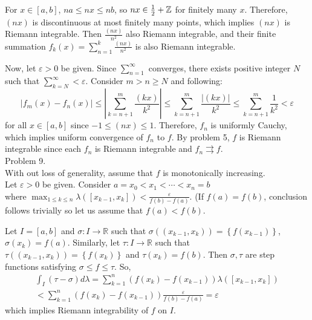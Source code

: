 For $x \in \left[ a, b \right]$, $na \leq nx \leq nb$, so $nx \in {1 \over 2} + \mathbb{Z}$ for finitely many $x$. Therefore, $(nx)$ is discontinuous at most finitely many points, which implies $\left( nx \right)$ is Riemann integrable.
Then $\frac{\left( nx \right)}{n^2}$ also Riemann integrable, and their finite summation $f_k (x) = \sum_{n=1}^{k} \frac{\left( nx \right)}{n^2}$ is also Riemann integrable.

Now, let $\varepsilon > 0$ be given. Since $\sum_{n=1}^{\infty}$ converges, there exists positive integer $N$ such that $\sum_{k=N}^{\infty} < \varepsilon$.
Consider $m > n \geq N$ and following:
\begin{equation*}
	\left | f_m(x) - f_n(x)  \right | \leq \left | \sum_{k=n+1}^{m} \frac{\left( kx \right)}{k^2} \right |
	\leq \sum_{k=n+1}^{m}\frac{\left | \left( kx \right) \right |}{k^2} \leq \sum_{k=n+1}^{m} \frac{1}{k^2} < \varepsilon
	\label{<+label+>}
\end{equation*}
for all $x \in \left[ a, b \right]$ since $ -1 \leq \left( nx \right) \leq 1$.
Therefore, $f_n$ is uniformly Cauchy, which implies uniform convergence of $f_n$ to $f$.
By problem 5, $f$ is Riemann integrable since each $f_n$ is Riemann integrable and $f_n \rightrightarrows f$. \\

Problem 9. \\

With out loss of generality, assume that $f$ is monotonically increasing.\\

Let $\varepsilon >0$ be given. Consider $a = x_0 < x_1 < \cdots < x_n = b$ \\
where $\max_{ 1\leq k \leq n }\lambda\left( \left[ x_{k-1}, x_k \right] \right) < \frac{\varepsilon}{f(b) - f(a)}$. (If $f(a) = f(b)$, conclusion follows trivially so let us assume that $f(a) < f(b)$.

	Let $I = \left[ a, b \right]$ and $\sigma : I \rightarrow \mathbb{R}$ such that $\sigma\left( \left( x_{k-1}, x_k \right) \right) = \left\{ f(x_{k-1}) \right\} $, $\sigma(x_k) = f(a)$. Similarly, let $\tau: I \rightarrow \mathbb{R}$ such that $\tau\left( \left( x_{k-1}, x_k \right) \right) = \left\{ f\left( x_k \right) \right\}$ and $\tau(x_k) = f(b)$. 
	Then $\sigma, \tau$ are step functions satisfying $\sigma \leq f \leq \tau$.
	So, 
	\begin{equation*}
			\begin{split}
				\int_{I}\left( \tau - \sigma \right) d\lambda = \sum_{k=1}^{n}\left( f(x_k) - f(x_{k-1}) \right)\lambda\left( \left[ x_{k-1}, x_k \right] \right)\\
				< \sum_{k=1}^{n} \left( f(x_k) - f(x_{k-1}) \right) \frac{\varepsilon}{f(b) - f(a)} = \varepsilon
			\end{split}
		\label{<+label+>}
	\end{equation*}
	which implies Riemann integrability of $f$ on $I$.\\

